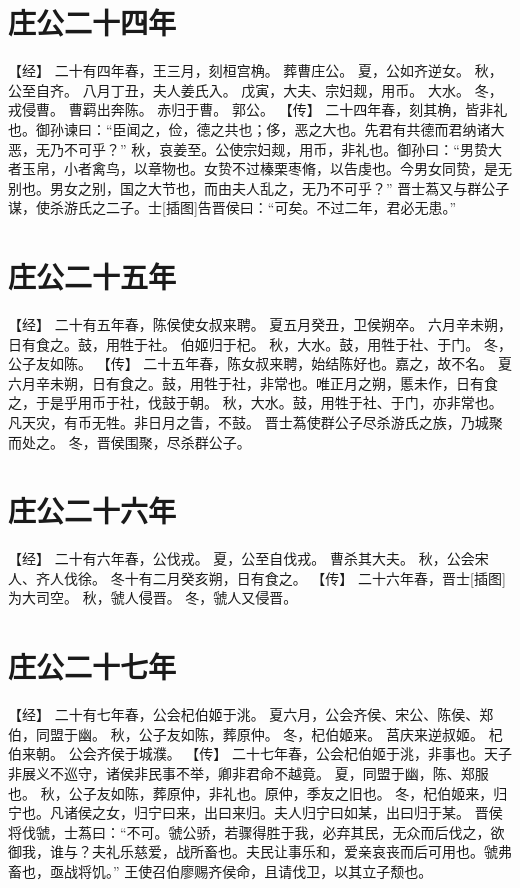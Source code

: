 \documentclass[a4paper,12pt,UTF8,twoside]{ctexbook}
\begin{document}
\chapter{庄公二十四年}

【经】
二十有四年春，王三月，刻桓宫桷。
葬曹庄公。
夏，公如齐逆女。
秋，公至自齐。
八月丁丑，夫人姜氏入。
戊寅，大夫、宗妇觌，用币。
大水。
冬，戎侵曹。
曹羁出奔陈。
赤归于曹。
郭公。
【传】
二十四年春，刻其桷，皆非礼也。御孙谏曰：“臣闻之，俭，德之共也；侈，恶之大也。先君有共德而君纳诸大恶，无乃不可乎？”
秋，哀姜至。公使宗妇觌，用币，非礼也。御孙曰：“男贽大者玉帛，小者禽鸟，以章物也。女贽不过榛栗枣脩，以告虔也。今男女同贽，是无别也。男女之别，国之大节也，而由夫人乱之，无乃不可乎？”
晋士蒍又与群公子谋，使杀游氏之二子。士[插图]告晋侯曰：“可矣。不过二年，君必无患。”

\chapter{庄公二十五年}

【经】
二十有五年春，陈侯使女叔来聘。
夏五月癸丑，卫侯朔卒。
六月辛未朔，日有食之。鼓，用牲于社。
伯姬归于杞。
秋，大水。鼓，用牲于社、于门。
冬，公子友如陈。
【传】
二十五年春，陈女叔来聘，始结陈好也。嘉之，故不名。
夏六月辛未朔，日有食之。鼓，用牲于社，非常也。唯正月之朔，慝未作，日有食之，于是乎用币于社，伐鼓于朝。
秋，大水。鼓，用牲于社、于门，亦非常也。凡天灾，有币无牲。非日月之眚，不鼓。
晋士蒍使群公子尽杀游氏之族，乃城聚而处之。
冬，晋侯围聚，尽杀群公子。

\chapter{庄公二十六年}

【经】
二十有六年春，公伐戎。
夏，公至自伐戎。
曹杀其大夫。
秋，公会宋人、齐人伐徐。
冬十有二月癸亥朔，日有食之。
【传】
二十六年春，晋士[插图]为大司空。
秋，虢人侵晋。
冬，虢人又侵晋。

\chapter{庄公二十七年}

【经】
二十有七年春，公会杞伯姬于洮。
夏六月，公会齐侯、宋公、陈侯、郑伯，同盟于幽。
秋，公子友如陈，葬原仲。
冬，杞伯姬来。
莒庆来逆叔姬。
杞伯来朝。
公会齐侯于城濮。
【传】
二十七年春，公会杞伯姬于洮，非事也。天子非展义不巡守，诸侯非民事不举，卿非君命不越竟。
夏，同盟于幽，陈、郑服也。
秋，公子友如陈，葬原仲，非礼也。原仲，季友之旧也。
冬，杞伯姬来，归宁也。凡诸侯之女，归宁曰来，出曰来归。夫人归宁曰如某，出曰归于某。
晋侯将伐虢，士蒍曰：“不可。虢公骄，若骤得胜于我，必弃其民，无众而后伐之，欲御我，谁与？夫礼乐慈爱，战所畜也。夫民让事乐和，爱亲哀丧而后可用也。虢弗畜也，亟战将饥。”
王使召伯廖赐齐侯命，且请伐卫，以其立子颓也。
\end{document}
